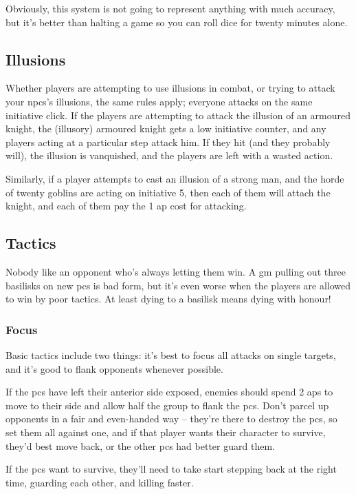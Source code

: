 \begin{multicols}{2}
Obviously, this system is not going to represent anything with much accuracy, but it's better than halting a game so you can roll dice for twenty minutes alone.

\subsection{Illusions}

Whether players are attempting to use illusions in combat, or trying to attack your \glspl{npc}'s illusions, the same rules apply; everyone attacks on the same initiative click.
If the players are attempting to attack the illusion of an armoured knight, the (illusory) armoured knight gets a low initiative counter, and any players acting at a particular step attack him.
If they hit (and they probably will), the illusion is vanquished, and the players are left with a wasted action.

Similarly, if a player attempts to cast an illusion of a strong man, and the horde of twenty goblins are acting on initiative 5, then each of them will attach the knight, and each of them pay the 1 \gls{ap} cost for attacking.

\subsection{Tactics}

Nobody like an opponent who's always letting them win.
A \gls{gm} pulling out three basilisks on new \glspl{pc} is bad form, but it's even worse when the players are allowed to win by poor tactics.
At least dying to a basilisk means dying with honour!

\subsubsection{Focus}

Basic tactics include two things: it's best to focus all attacks on single targets, and it's good to flank opponents whenever possible.

If the \glspl{pc} have left their anterior side exposed, enemies should spend 2 \glspl{ap} to move to their side and allow half the group to flank the \glspl{pc}.
Don't parcel up opponents in a fair and even-handed way -- they're there to destroy the \glspl{pc}, so set them all against one, and if that player wants their character to survive, they'd best move back, or the other \glspl{pc} had better guard them.

If the \glspl{pc} want to survive, they'll need to take start stepping back at the right time, guarding each other, and killing faster.


\end{multicols}
